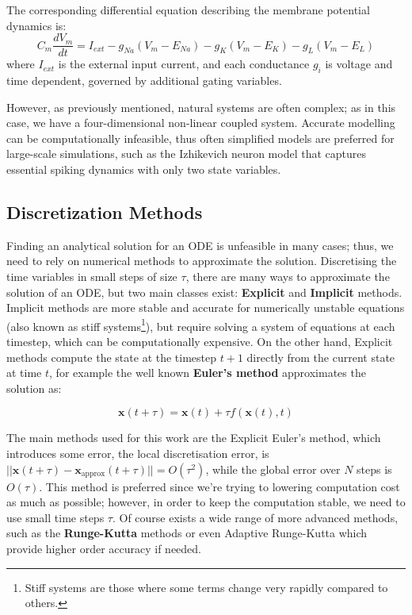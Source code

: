 The corresponding differential equation describing the membrane potential dynamics is:
\begin{equation}
    C_m \frac{dV_m}{dt} = I_{ext} - g_{Na}(V_m - E_{Na}) - g_K(V_m - E_K) - g_L(V_m - E_L)
\end{equation}
where $I_{ext}$ is the external input current, and each conductance $g_i$ is voltage and time dependent, governed by additional gating variables.

However, as previously mentioned, natural systems are often complex; as in this case, we have a four-dimensional non-linear coupled system. Accurate modelling can be computationally infeasible, thus often simplified models are
preferred for large-scale simulations, such as the Izhikevich neuron model \cite{1257420} that captures essential spiking dynamics with only two state variables.
\subsection{Discretization Methods}\label{sec:discretization_methods} 
Finding an analytical solution for an ODE is unfeasible in many cases; thus, we need to rely on numerical methods
to approximate the solution. Discretising the time variables in small steps of size $\tau$, there are many ways to approximate the solution of an ODE,
but two main classes exist: \textbf{Explicit} and \textbf{Implicit} methods.\newline
Implicit methods are more stable and accurate for numerically unstable equations (also known as stiff systems\footnote{Stiff systems are those where some terms change very rapidly compared to others.}), but require solving a system of equations at each timestep, which can be computationally expensive. On the other hand,
Explicit methods compute the state at the timestep $t+1$ directly from the current state at time $t$, for example the well known \textbf{Euler's method} \cite{scott2011numerical} approximates the solution as:

\begin{equation}
    \mathbf{x}(t+\tau) = \mathbf{x}(t) + \tau f(\mathbf{x}(t), t)
\end{equation}

The main methods used for this work are the Explicit Euler's method, which introduces some error, the local discretisation error,
is $||\mathbf{x}(t+\tau) - \mathbf{x}_{\text{approx}}(t+\tau)|| = O(\tau^2)$, while the global error over $N$ steps is $O(\tau)$. 
This method is preferred since we're trying to 
lowering computation cost as much as possible; however, in order to keep the computation stable, we need to use small time steps $\tau$.
Of course exists a wide range of more advanced methods, such as the \textbf{Runge-Kutta} methods or even Adaptive Runge-Kutta \cite{scott2011numerical} which provide higher order accuracy if needed.

